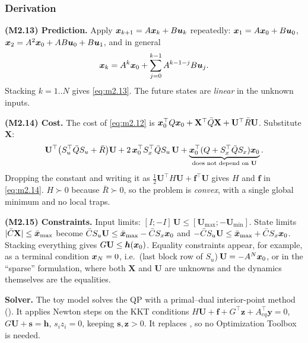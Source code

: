 \subsubsection*{Derivation}

\textbf{(M2.13) Prediction.} Apply $\bm{x}_{k+1}=A\bm{x}_k+B\bm{u}_k$ repeatedly:
$\bm{x}_1=A\bm{x}_0+B\bm{u}_0$, $\bm{x}_2=A^2\bm{x}_0+AB\bm{u}_0+B\bm{u}_1$, and in general
\[
  \bm{x}_k=A^k\bm{x}_0+\sum_{j=0}^{k-1}A^{k-1-j}B\bm{u}_j .
\]
Stacking $k=1..N$ gives \eqref{eq:m2.13}. The future states are \emph{linear} in the unknown inputs.

\textbf{(M2.14) Cost.} The cost of \eqref{eq:m2.12} is $\bm{x}_0^\top Q\bm{x}_0+\mathbf X^\top\bar Q\mathbf X+\mathbf U^\top\bar R\mathbf U$.
Substitute $\mathbf X$:
\[
  \mathbf U^\top\big(S_u^\top\bar QS_u+\bar R\big)\mathbf U+2\,\bm{x}_0^\top S_x^\top\bar QS_u\,\mathbf U+\underbrace{\bm{x}_0^\top(Q+S_x^\top\bar QS_x)\bm{x}_0}_{\text{does not depend on }\mathbf U}.
\]
Dropping the constant and writing it as $\tfrac12\mathbf U^\top H\mathbf U+\bm f^\top\mathbf U$ gives $H$ and $\bm f$ in
\eqref{eq:m2.14}. $H\succ0$ because $\bar R\succ0$, so the problem is \emph{convex}, with a single global minimum
and no local traps.

\textbf{(M2.15) Constraints.} Input limits: $[I;-I]\,\mathbf U\le[\mathbf U_{\max};-\mathbf U_{\min}]$. State limits
$|\bar C\mathbf X|\le\bar{\bm{x}}_{\max}$ become
$\bar CS_u\mathbf U\le\bar{\bm{x}}_{\max}-\bar CS_x\bm{x}_0$ and $-\bar CS_u\mathbf U\le\bar{\bm{x}}_{\max}+\bar CS_x\bm{x}_0$.
Stacking everything gives $G\mathbf U\le\bm h(\bm{x}_0)$. Equality constraints appear, for example, as a terminal
condition $\bm{x}_N=0$, i.e.\ (last block row of $S_u$)$\,\mathbf U=-A^N\bm{x}_0$, or in the ``sparse'' formulation, where both
$\mathbf X$ and $\mathbf U$ are unknowns and the dynamics themselves are the equalities.

\textbf{Solver.} The toy model solves the QP with a primal--dual interior-point method ().
It applies Newton steps on the KKT conditions $H\mathbf U+\bm f+G^\top\bm z+A_{eq}^\top\bm y=0$, $G\mathbf U+\bm s=\bm h$,
$s_iz_i=0$, keeping $\bm s,\bm z>0$. It replaces , so no Optimization Toolbox is needed.

